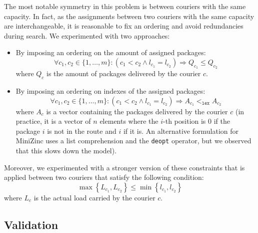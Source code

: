 The most notable symmetry in this problem is between couriers with the same capacity. In fact, as the assignments between two couriers with the same capacity are interchangeable, it is reasonable to fix an ordering and avoid redundancies during search. We experimented with two approaches: 
\begin{itemize}
    \item By imposing an ordering on the amount of assigned packages:
        \begin{equation}
            \forall c_1, c_2 \in \{ 1, \dots, m \}: (c_1 < c_2 \land l_{c_1} = l_{c_2}) \Rightarrow Q_{c_1} \leq Q_{c_2}
        \end{equation}
        where $Q_c$ is the amount of packages delivered by the courier $c$.
    \item By imposing an ordering on indexes of the assigned packages:
        \begin{equation}
            \forall c_1, c_2 \in \{ 1, \dots, m \}: (c_1 < c_2 \land l_{c_1} = l_{c_2}) \Rightarrow A_{c_1} <_\texttt{lex} A_{c_2}
        \end{equation}
        where $A_c$ is a vector containing the packages delivered by the courier $c$ (in practice, it is a vector of $n$ elements where the $i$-th position is 0 if the package $i$ is not in the route and $i$ if it is. An alternative formulation for MiniZinc uses a list comprehension and the \texttt{deopt} operator, but we observed that this slows down the model).
\end{itemize}

Moreover, we experimented with a stronger version of these constraints that is applied between two couriers that satisfy the following condition:
\begin{equation}
    \max\left\{ L_{c_1}, L_{c_2} \right\} \leq \min\left\{ l_{c_1}, l_{c_2} \right\}
\end{equation}
where $L_c$ is the actual load carried by the courier $c$.

\subsection{Validation}